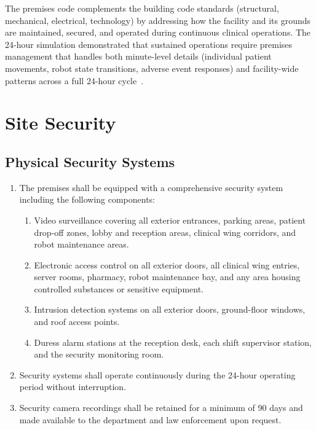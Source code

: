 \documentclass[11pt,letterpaper]{article}
\begin{document}
The premises code complements the building code standards (structural,
mechanical, electrical, technology) by addressing how the facility and its
grounds are maintained, secured, and operated during continuous clinical
operations. The 24-hour simulation demonstrated that sustained operations
require premises management that handles both minute-level details (individual
patient movements, robot state transitions, adverse event responses) and
facility-wide patterns across a full 24-hour cycle~\cite{newtrial2026}.

\section{Site Security}

\subsection{Physical Security Systems}

\begin{enumerate}[label=(\alph*)]
\item The premises shall be equipped with a comprehensive security system
  including the following components:
  \begin{enumerate}[label=(\arabic*)]
  \item Video surveillance covering all exterior entrances, parking areas,
    patient drop-off zones, lobby and reception areas, clinical wing corridors,
    and robot maintenance areas.
  \item Electronic access control on all exterior doors, all clinical wing
    entries, server rooms, pharmacy, robot maintenance bay, and any area
    housing controlled substances or sensitive equipment.
  \item Intrusion detection systems on all exterior doors, ground-floor windows,
    and roof access points.
  \item Duress alarm stations at the reception desk, each shift supervisor
    station, and the security monitoring room.
  \end{enumerate}

\item Security systems shall operate continuously during the 24-hour operating
  period without interruption.

\item Security camera recordings shall be retained for a minimum of 90 days
  and made available to the department and law enforcement upon request.
\end{enumerate}
\end{document}
